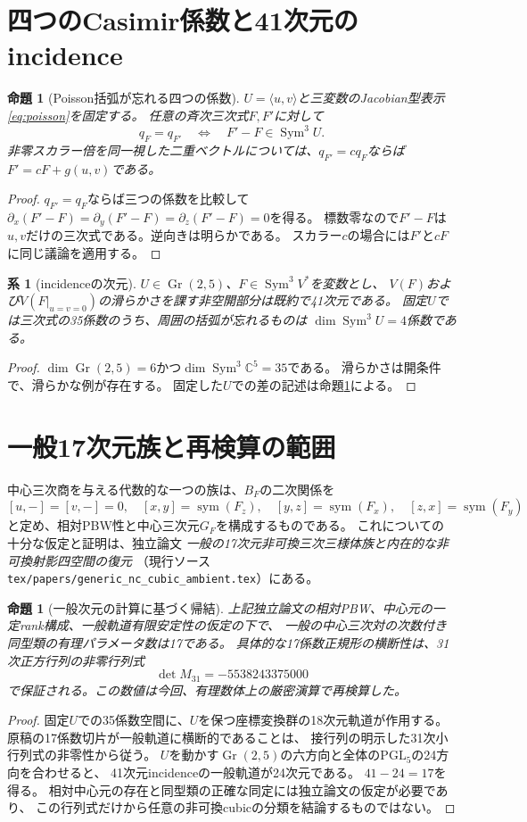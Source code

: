 \documentclass[a4paper,11pt]{ltjsarticle}
\newcommand{\CC}{\mathbb C}
\newcommand{\Sym}{\operatorname{Sym}}
\newcommand{\Gr}{\operatorname{Gr}}
\newtheorem{proposition}[theorem]{命題}
\newtheorem{corollary}[theorem]{系}
\theoremstyle{remark}
\begin{document}
\section{四つのCasimir係数と41次元のincidence}
\begin{proposition}[Poisson括弧が忘れる四つの係数]\label{prop:forget}
$U=\langle u,v\rangle$と三変数のJacobian型表示\eqref{eq:poisson}を固定する。
任意の斉次三次式$F,F'$に対して
\[
q_F=q_{F'}\quad\Longleftrightarrow\quad F'-F\in\Sym^3 U.
\]
非零スカラー倍を同一視した二重ベクトルについては、$q_{F'}=c q_F$ならば
$F'=cF+g(u,v)$である。
\end{proposition}
\begin{proof}
$q_{F'}=q_F$ならば三つの係数を比較して
$\partial_x(F'-F)=\partial_y(F'-F)=\partial_z(F'-F)=0$を得る。
標数零なので$F'-F$は$u,v$だけの三次式である。逆向きは明らかである。
スカラー$c$の場合には$F'$と$cF$に同じ議論を適用する。
\end{proof}
\begin{corollary}[incidenceの次元]\label{cor:41}
$U\in\Gr(2,5)$、$F\in\Sym^3V^*$を変数とし、
$V(F)$および$V(F|_{u=v=0})$の滑らかさを課す非空開部分は既約で41次元である。
固定$U$では三次式の35係数のうち、周囲の括弧が忘れるものは
$\dim\Sym^3U=4$係数である。
\end{corollary}
\begin{proof}
$\dim\Gr(2,5)=6$かつ$\dim\Sym^3\CC^5=35$である。
滑らかさは開条件で、滑らかな例が存在する。
固定した$U$での差の記述は命題\ref{prop:forget}による。
\end{proof}

\section{一般17次元族と再検算の範囲}
中心三次商を与える代数的な一つの族は、$B_F$の二次関係を
\[
[u,-]=[v,-]=0,\quad
[x,y]=\operatorname{sym}(F_z),\quad
[y,z]=\operatorname{sym}(F_x),\quad
[z,x]=\operatorname{sym}(F_y)
\]
と定め、相対PBW性と中心三次元$G_F$を構成するものである。
これについての十分な仮定と証明は、独立論文
\emph{一般の17次元非可換三次三様体族と内在的な非可換射影四空間の復元}
（現行ソース\texttt{tex/papers/generic\_nc\_cubic\_ambient.tex}）にある。
\begin{proposition}[一般次元の計算に基づく帰結]\label{prop:17}
上記独立論文の相対PBW、中心元の一定rank構成、一般軌道有限安定性の仮定の下で、
一般の中心三次対の次数付き同型類の有理パラメータ数は17である。
具体的な17係数正規形の横断性は、31次正方行列の非零行列式
\[
\det M_{31}=-5538243375000
\]
で保証される。この数値は今回、有理数体上の厳密演算で再検算した。
\end{proposition}
\begin{proof}
固定$U$での35係数空間に、$U$を保つ座標変換群の18次元軌道が作用する。
原稿の17係数切片が一般軌道に横断的であることは、
接行列の明示した31次小行列式の非零性から従う。
$U$を動かす$\Gr(2,5)$の六方向と全体の$\mathrm{PGL}_5$の24方向を合わせると、
41次元incidenceの一般軌道が24次元である。
$41-24=17$を得る。
相対中心元の存在と同型類の正確な同定には独立論文の仮定が必要であり、
この行列式だけから任意の非可換cubicの分類を結論するものではない。
\end{proof}
\end{document}
